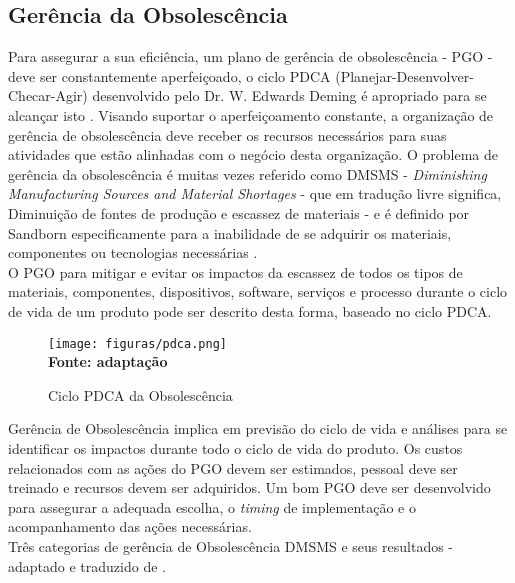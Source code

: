 \subsection{\esp Gerência da Obsolescência}

Para assegurar a sua eficiência, um plano de gerência de obsolescência - PGO - deve ser constantemente aperfeiçoado, o ciclo PDCA (Planejar-Desenvolver-Checar-Agir) desenvolvido pelo Dr. W. Edwards Deming é apropriado para se alcançar isto \cite{sandborn2012}.
Visando suportar o aperfeiçoamento constante, a organização de gerência de obsolescência deve receber os recursos necessários para suas atividades que estão alinhadas com o negócio desta organização. O problema de gerência da obsolescência é muitas vezes referido como DMSMS - \textit{Diminishing Manufacturing Sources and Material Shortages} - que em tradução livre significa, Diminuição de fontes de produção e escassez de materiais - e é definido por Sandborn especificamente para a inabilidade de se adquirir os materiais, componentes ou tecnologias necessárias \cite{sandborn2012}.\\
O PGO para mitigar e evitar os impactos da escassez de todos os tipos de materiais, componentes, dispositivos, software, serviços e processo durante o ciclo de vida de um produto pode ser descrito desta forma, baseado no ciclo PDCA.

\begin{figure}[ht]
	\centering	
	\caption[\hspace{0.1cm}PDCA.]{Ciclo PDCA da Obsolescência}
	\vspace{-0.4cm}
	\texttt{[image: figuras/pdca.png]}
	\vspace{-0.2cm}
	\\\textbf{\footnotesize Fonte: \cite{sandborn2012} adaptação }	
	\label{fig:figurapdca}
\end{figure}
\vspace{-0.5cm}
\newpage 
Gerência de Obsolescência implica em previsão do ciclo de vida e análises para se identificar os impactos durante todo o ciclo de vida do produto. Os custos relacionados com as ações do PGO devem ser estimados, pessoal deve ser treinado e recursos devem ser adquiridos. Um bom PGO deve ser desenvolvido para assegurar a adequada escolha, o \textit{timing} de implementação e o acompanhamento das ações necessárias.\\

Três categorias de gerência de Obsolescência DMSMS e seus resultados - adaptado e traduzido de \cite{sandborn2008}.



